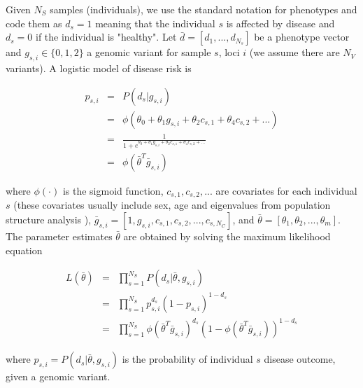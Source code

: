 Given $N_S$ samples (individuals), we use the standard notation for phenotypes and code them as $d_s=1$ meaning that the individual $s$ is affected by disease and $d_s=0$ if the individual is "healthy". Let $\bar{d} = [d_1, ..., d_{N_s}]$ be a phenotype vector and $g_{s,i} \in \{0,1,2\}$ a genomic variant for sample $s$, loci $i$ (we assume there are $N_V$ variants). A logistic model of disease risk \cite{balding2006tutorial} is

\begin{eqnarray*}
    p_{s,i} & = & P( d_s | g_{s,i} ) \\
    & = & \phi( \theta_0 + \theta_1 g_{s,i} + \theta_2 c_{s,1} + \theta_4 c_{s,2} + ... ) \\
    & = & \frac{1}{1 + e^{\theta_0 + \theta_1 g_{s,i} + \theta_2 c_{s,1} + \theta_4 c_{s,2} + ...}} \\
    & = & \phi( \bar{\theta}^T \bar{g}_{s,i})
\end{eqnarray*}

where $\phi(\cdot)$ is the sigmoid function, $c_{s,1}, c_{s,2}, ... $ are covariates for each individual $s$ (these covariates usually include sex, age and eigenvalues from population structure analysis \cite{price2006principal}), $\bar{g}_{s,i} = [ 1, g_{s,i} , c_{s,1}, c_{s,2}, ... , c_{s,N_C} ]$, and $\bar{\theta} = [\theta_1, \theta_2, ..., \theta_m] $. The parameter estimates $\bar{\theta}$ are obtained by solving the maximum likelihood equation

\begin{eqnarray*}
    L( \bar{\theta} ) & = & \prod_{s=1}^{N_S}{ P( d_s | \bar{\theta}, g_{s,i} ) } \\
    & = & \prod_{s=1}^{N_S}{ p_{s,i}^{d_s} (1-p_{s,i})^{1-d_s} } \\
    & = & \prod_{s=1}^{N_S}{ \phi( \bar{\theta}^T \bar{g}_{s,i})^{d_s} (1-\phi( \bar{\theta}^T \bar{g}_{s,i}))^{1-d_s} }
\end{eqnarray*}

where $p_{s,i} = P( d_s | \bar{\theta}, g_{s,i} )$ is the probability of individual $s$ disease outcome, given a genomic variant.

